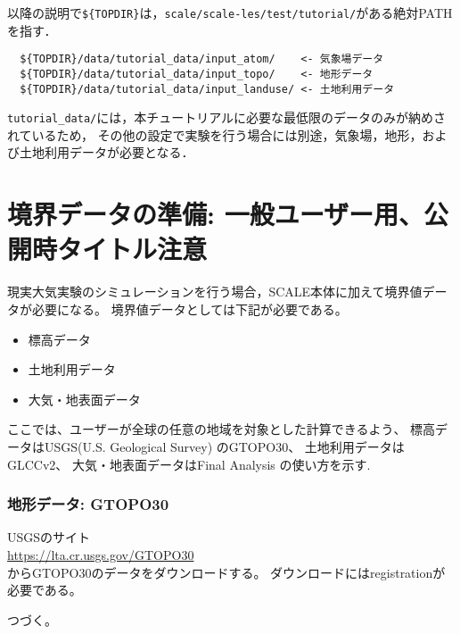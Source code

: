 以降の説明で\verb|${TOPDIR}|は，\verb|scale/scale-les/test/tutorial/|がある絶対PATHを指す．

\begin{verbatim}
  ${TOPDIR}/data/tutorial_data/input_atom/    <- 気象場データ
  ${TOPDIR}/data/tutorial_data/input_topo/    <- 地形データ
  ${TOPDIR}/data/tutorial_data/input_landuse/ <- 土地利用データ
\end{verbatim}
\verb|tutorial_data/|には，本チュートリアルに必要な最低限のデータのみが納めされているため，
その他の設定で実験を行う場合には別途，気象場，地形，および土地利用データが必要となる．


\section{境界データの準備: 一般ユーザー用、公開時タイトル注意}

現実大気実験のシミュレーションを行う場合，SCALE本体に加えて境界値データが必要になる。
境界値データとしては下記が必要である。
\begin{itemize}
\item 標高データ
\item 土地利用データ
\item 大気・地表面データ
\end{itemize}

ここでは、ユーザーが全球の任意の地域を対象とした計算できるよう、
標高データはUSGS(U.S. Geological Survey) のGTOPO30、
土地利用データはGLCCv2、
大気・地表面データはFinal Analysis の使い方を示す.


\subsubsection{地形データ: GTOPO30}

USGSのサイト\\
 \url{https://lta.cr.usgs.gov/GTOPO30}\\
からGTOPO30のデータをダウンロードする。
ダウンロードにはregistrationが必要である。


つづく。


